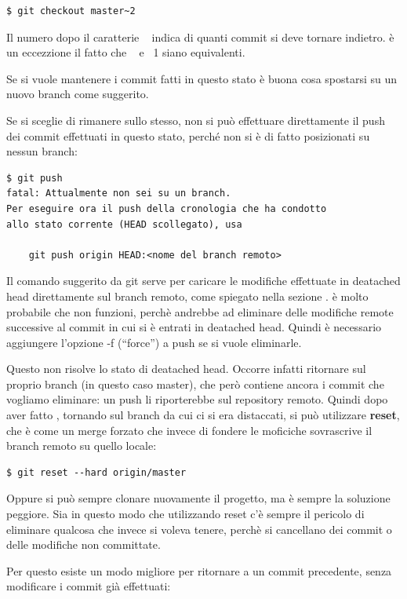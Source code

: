\documentclass{article}
\begin{document}
\begin{verbatim}
$ git checkout master~2
\end{verbatim}

Il numero dopo il caratterie ~ indica di quanti commit si deve tornare indietro.
è un eccezzione il fatto che ~ e ~1 siano equivalenti.

Se si vuole mantenere i commit fatti in questo stato è buona cosa spostarsi su
un nuovo branch come suggerito.

Se si sceglie di rimanere sullo stesso, non si può effettuare direttamente il push dei
commit effettuati in questo stato, perché non si è di fatto posizionati su nessun branch:

\begin{verbatim}
$ git push
fatal: Attualmente non sei su un branch.
Per eseguire ora il push della cronologia che ha condotto
allo stato corrente (HEAD scollegato), usa

    git push origin HEAD:<nome del branch remoto>
\end{verbatim}

Il comando suggerito da git serve per caricare le modifiche effettuate in deatached head
direttamente sul branch remoto, come spiegato nella sezione .
è molto probabile che non funzioni, perchè andrebbe ad
eliminare delle modifiche remote successive al commit in
cui si è entrati in deatached head. Quindi è necessario aggiungere l'opzione -f
(``force'') a push se si vuole eliminarle.

Questo non risolve lo stato di deatached head.
Occorre infatti ritornare sul proprio branch (in questo caso master),
che però contiene ancora i commit che vogliamo eliminare: un push li riporterebbe sul 
repository remoto.
Quindi dopo aver fatto , tornando sul branch da cui ci
si era distaccati, si può utilizzare \textbf{reset}, che è come un merge forzato
che invece di fondere le moficiche sovrascrive il branch remoto su quello locale:

\begin{verbatim}
$ git reset --hard origin/master
\end{verbatim}

Oppure si può sempre clonare nuovamente il progetto, ma è sempre la soluzione
peggiore. Sia in questo modo che utilizzando reset c'è sempre il pericolo di
eliminare qualcosa che invece si voleva tenere, perchè si cancellano dei commit
o delle modifiche non committate.

Per questo esiste un modo migliore per ritornare a un commit precedente, senza
modificare i commit già effettuati:
\end{document}
